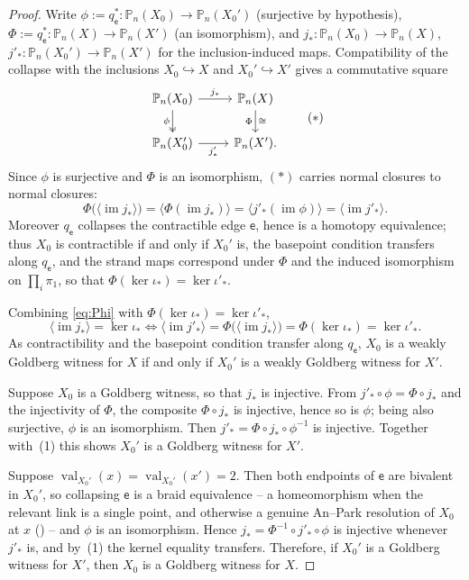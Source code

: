 \documentclass[reqno]{amsart}
\theoremstyle{definition}
\newcommand\sfe{\mathsf{e}}
\newcommand{\PB}{\mathbb{P}}
\newcommand{\im}{\operatorname{im}}
\newcommand{\co}[1]{\mathopen{\langle}#1\mathclose{\rangle}} %
\DeclareMathOperator{\val}{val}
\numberwithin{equation}{section}
\begin{document}
\begin{proof}
Write \(\phi:=q_\sfe^\ast\colon\PB_n(X_0)\to\PB_n(X_0')\) (surjective by
hypothesis), \(\Phi:=q_\sfe^\ast\colon\PB_n(X)\to\PB_n(X')\) (an
isomorphism), and \(j_\ast\colon\PB_n(X_0)\to\PB_n(X)\),
\(j'_\ast\colon\PB_n(X_0')\to\PB_n(X')\) for the inclusion-induced
maps. Compatibility of the collapse with the inclusions
\(X_0\hookrightarrow X\) and \(X_0'\hookrightarrow X'\) gives a
commutative square
\[
\begin{tikzcd}
\PB_n(X_0)\ar[r,"j_\ast"]\ar[d,"\phi"',two heads]
  & \PB_n(X)\ar[d,"\Phi"',"\cong"]\\
\PB_n(X_0')\ar[r,"j_\ast'"'] & \PB_n(X').
\end{tikzcd}
\tag{$\ast$}
\]
Since \(\phi\) is surjective and \(\Phi\) is an isomorphism,
\((\ast)\) carries normal closures to normal closures:
\begin{equation}
\Phi\bigl(\co{\im j_\ast}\bigr)
=\co{\Phi(\im j_\ast)}
=\co{j'_\ast(\im\phi)}
=\co{\im j'_\ast}.
\label{eq:Phi}
\end{equation}
Moreover \(q_\sfe\) collapses the contractible edge \(\sfe\), hence is a
homotopy equivalence; thus \(X_0\) is contractible if and only if
\(X_0'\) is, the basepoint condition transfers along \(q_\sfe\), and the
strand maps correspond under \(\Phi\) and the induced isomorphism on
\(\prod_i\pi_1\), so that \(\Phi(\ker\iota_\ast)=\ker\iota'_\ast\).

Combining \eqref{eq:Phi} with
\(\Phi(\ker\iota_\ast)=\ker\iota'_\ast\),
\[
\co{\im j_\ast}=\ker\iota_\ast
\Longleftrightarrow
\co{\im j'_\ast}=\Phi\bigl(\co{\im j_\ast}\bigr)
=\Phi(\ker\iota_\ast)=\ker\iota'_\ast .
\]
As contractibility and the basepoint condition transfer along
\(q_\sfe\), \(X_0\) is a weakly Goldberg witness for \(X\) if and only if
\(X_0'\) is a weakly Goldberg witness for \(X'\).

Suppose \(X_0\) is a Goldberg witness, so that \(j_\ast\)
is injective. From \(j'_\ast\circ\phi=\Phi\circ j_\ast\) and the
injectivity of \(\Phi\), the composite \(\Phi\circ j_\ast\) is
injective, hence so is \(\phi\); being also surjective, \(\phi\) is an
isomorphism. Then \(j'_\ast=\Phi\circ j_\ast\circ\phi^{-1}\) is
injective. Together with~(1) this shows \(X_0'\) is a Goldberg witness
for \(X'\).

Suppose \(\val_{X_0'}(x)=\val_{X_0'}(x')=2\). Then both
endpoints of \(\sfe\) are bivalent in \(X_0'\), so collapsing \(\sfe\) is a
braid equivalence -- a homeomorphism when the relevant link is a
single point, and otherwise a genuine An--Park resolution of \(X_0\)
at \(x\) (\cite[Prop.~3.11]{AnPark2017}) -- and \(\phi\) is an
isomorphism. Hence \(j_\ast=\Phi^{-1}\circ j'_\ast\circ\phi\) is
injective whenever \(j'_\ast\) is, and by~(1) the kernel equality
transfers. Therefore, if \(X_0'\) is a Goldberg witness for \(X'\),
then \(X_0\) is a Goldberg witness for \(X\).
\end{proof}
\end{document}

